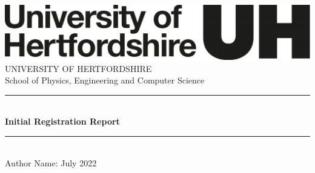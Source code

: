 \newcommand{\reporttitle}{Initial Registration Report}
\newcommand{\reportauthor}{Author Name}
\newcommand{\reportdate}{1 July 2022}

\begin{titlepage}

\newcommand{\HRule}{\rule{\linewidth}{0.5mm}}
\center
\vspace{2cm}
\includegraphics[scale=0.2]{herts-logo-black.png} \\[4cm]
\textsf{\LARGE
UNIVERSITY OF HERTFORDSHIRE
} \\[1cm]
\textsf{\LARGE
School of Physics, Engineering and Computer Science} \\[4cm]


\HRule \\[0.4cm]
{ \huge \bfseries \reporttitle \\[0.15cm] }
\HRule \\[1.5cm]
\textsf{\large \reportauthor \enspace : \enspace \reportdate}


\end{titlepage}
